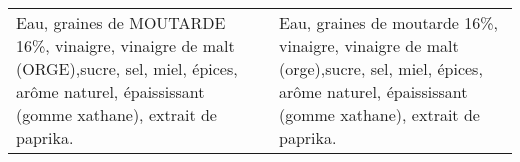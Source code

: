 \begin{tabular}{p{7cm}p{7cm}}
                                                                                                                                                                                                                                                                                                                                                                                                                                                                                                                                                                                                                                                                                                                                                                                                                                                                                                                                                                                                                                                                                                                                                                                                                                                                                                                                                                                                                                                                                                                                                          Eau, graines de MOUTARDE 16\%, vinaigre, vinaigre de malt (ORGE),sucre, sel, miel, épices, arôme naturel, épaississant (gomme xathane), extrait de paprika. &                                                                                                                                                                                                                                                                                                                                                                                                   Eau, graines de moutarde 16\%, vinaigre, vinaigre de malt (orge),sucre, sel, miel, épices, arôme naturel, épaississant (gomme xathane), extrait de paprika. \\

\end{tabular}
